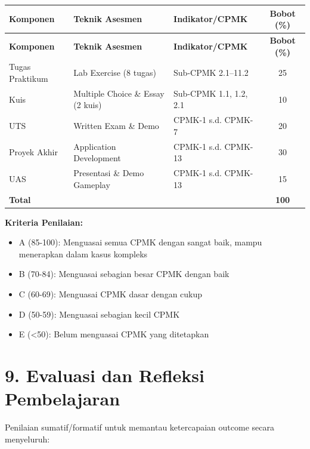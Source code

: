\documentclass[12pt,a4paper]{article}
\begin{document}
\begin{longtable}{|>{\raggedright\arraybackslash}p{2.5cm}|>{\raggedright\arraybackslash}p{4cm}|>{\raggedright\arraybackslash}p{5.5cm}|c|}
\hline
\textbf{Komponen} & \textbf{Teknik Asesmen} & \textbf{Indikator/CPMK} & \textbf{Bobot (\%)} \\
\hline
\endfirsthead
\hline
\textbf{Komponen} & \textbf{Teknik Asesmen} & \textbf{Indikator/CPMK} & \textbf{Bobot (\%)} \\
\hline
\endhead
\hline
\endfoot

Tugas Praktikum & Lab Exercise (8 tugas) & Sub-CPMK 2.1--11.2 & 25 \\
\hline
Kuis & Multiple Choice \& Essay (2 kuis) & Sub-CPMK 1.1, 1.2, 2.1 & 10 \\
\hline
UTS & Written Exam \& Demo & CPMK-1 s.d. CPMK-7 & 20 \\
\hline
Proyek Akhir & Application Development & CPMK-1 s.d. CPMK-13 & 30 \\
\hline
UAS & Presentasi \& Demo Gameplay & CPMK-1 s.d. CPMK-13 & 15 \\
\hline
\textbf{Total} & & & \textbf{100} \\
\hline
\end{longtable}

\textbf{Kriteria Penilaian:}
\begin{itemize}[leftmargin=*]
  \item A (85-100): Menguasai semua CPMK dengan sangat baik, mampu menerapkan dalam kasus kompleks
  \item B (70-84): Menguasai sebagian besar CPMK dengan baik
  \item C (60-69): Menguasai CPMK dasar dengan cukup
  \item D (50-59): Menguasai sebagian kecil CPMK
  \item E (<50): Belum menguasai CPMK yang ditetapkan
\end{itemize}

\vspace{0.5cm}

\section*{9. Evaluasi dan Refleksi Pembelajaran}

Penilaian sumatif/formatif untuk memantau ketercapaian outcome secara menyeluruh:
\end{document}
